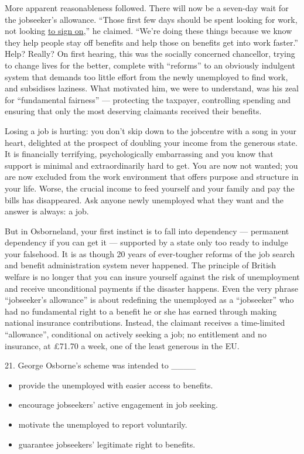 \documentclass[UTF8,11pt]{ctexart}
\begin{document}
More apparent reasonableness followed. There will now be a seven-day wait for the jobseeker’s allowance. “Those first few days should be spent looking for work, not looking \uline{to sign on},” he claimed. “We’re doing these things because we know they help people stay off benefits and help those on benefits get into work faster.” Help? Really? On first hearing, this was the socially concerned chancellor, trying to change lives for the better, complete with “reforms” to an obviously indulgent system that demands too little effort from the newly unemployed to find work, and subsidises laziness. What motivated him, we were to understand, was his zeal for “fundamental fairness” — protecting the taxpayer, controlling spending and ensuring that only the most deserving claimants received their benefits.


Losing a job is hurting: you don’t skip down to the jobcentre with a song in your heart, delighted at the prospect of doubling your income from the generous state. It is financially terrifying, psychologically embarrassing and you know that support is minimal and extraordinarily hard to get. You are now not wanted; you are now excluded from the work environment that offers purpose and structure in your life. Worse, the crucial income to feed yourself and your family and pay the bills has disappeared. Ask anyone newly unemployed what they want and the answer is always: a job.


But in Osborneland, your first instinct is to fall into dependency — permanent dependency if you can get it — supported by a state only too ready to indulge your falsehood. It is as though 20 years of ever-tougher reforms of the job search and benefit administration system never happened. The principle of British welfare is no longer that you can insure yourself against the risk of unemployment and receive unconditional payments if the disaster happens. Even the very phrase “jobseeker’s allowance” is about redefining the unemployed as a “jobseeker” who had no fundamental right to a benefit he or she has earned through making national insurance contributions. Instead, the claimant receives a time-limited “allowance”, conditional on actively seeking a job; no entitlement and no insurance, at £71.70 a week, one of the least generous in the EU.


21. George Osborne’s scheme was intended to \_\_\_\_


\begin{itemize}[leftmargin=2em,itemsep=.2em,topsep=.4em]\item[A.] provide the unemployed with easier access to benefits.
\item[B.] encourage jobseekers’ active engagement in job seeking.
\item[C.] motivate the unemployed to report voluntarily.
\item[D.] guarantee jobseekers’ legitimate right to benefits.
\end{itemize}
\end{document}
